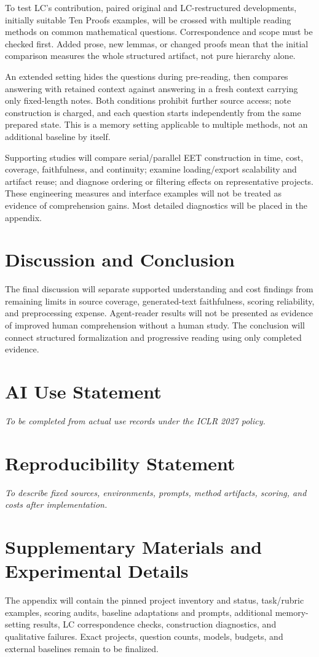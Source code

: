 \documentclass{article}
\begin{document}
To test LC's contribution, paired original and LC-restructured developments, initially suitable Ten Proofs examples, will be crossed with multiple reading methods on common mathematical questions. Correspondence and scope must be checked first. Added prose, new lemmas, or changed proofs mean that the initial comparison measures the whole structured artifact, not pure hierarchy alone.

An extended setting hides the questions during pre-reading, then compares answering with retained context against answering in a fresh context carrying only fixed-length notes. Both conditions prohibit further source access; note construction is charged, and each question starts independently from the same prepared state. This is a memory setting applicable to multiple methods, not an additional baseline by itself.

Supporting studies will compare serial/parallel EET construction in time, cost, coverage, faithfulness, and continuity; examine loading/export scalability and artifact reuse; and diagnose ordering or filtering effects on representative projects. These engineering measures and interface examples will not be treated as evidence of comprehension gains. Most detailed diagnostics will be placed in the appendix.

\section{Discussion and Conclusion}
\label{sec:conclusion}
The final discussion will separate supported understanding and cost findings from remaining limits in source coverage, generated-text faithfulness, scoring reliability, and preprocessing expense. Agent-reader results will not be presented as evidence of improved human comprehension without a human study. The conclusion will connect structured formalization and progressive reading using only completed evidence.

\section*{AI Use Statement}
\noindent\textit{To be completed from actual use records under the ICLR 2027 policy.}
\section*{Reproducibility Statement}
\noindent\textit{To describe fixed sources, environments, prompts, method artifacts, scoring, and costs after implementation.}
% 
% 

\appendix
\section{Supplementary Materials and Experimental Details}
The appendix will contain the pinned project inventory and status, task/rubric examples, scoring audits, baseline adaptations and prompts, additional memory-setting results, LC correspondence checks, construction diagnostics, and qualitative failures. Exact projects, question counts, models, budgets, and external baselines remain to be finalized.
\end{document}
